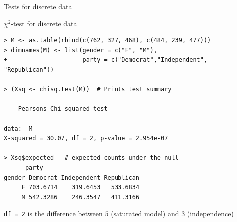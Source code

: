 \documentclass[dvipsnames,aspectratio=169,handout]{beamer}
\begin{document}
\begin{frame}[fragile]{Tests for discrete data}
	\begin{alertblock}{$\chi^2$-test for discrete data}
   \begin{lstlisting}
> M <- as.table(rbind(c(762, 327, 468), c(484, 239, 477)))
> dimnames(M) <- list(gender = c("F", "M"),
+                     party = c("Democrat","Independent", "Republican"))

> (Xsq <- chisq.test(M))  # Prints test summary

	Pearsons Chi-squared test

data:  M
X-squared = 30.07, df = 2, p-value = 2.954e-07
     
> Xsq$expected   # expected counts under the null
      party
gender Democrat Independent Republican
     F 703.6714    319.6453   533.6834
     M 542.3286    246.3547   411.3166
      \end{lstlisting}
\end{alertblock}
\texttt{df = 2} is the difference between $5$ (saturated model) and $3$ (independence)
\end{frame}
\end{document}

